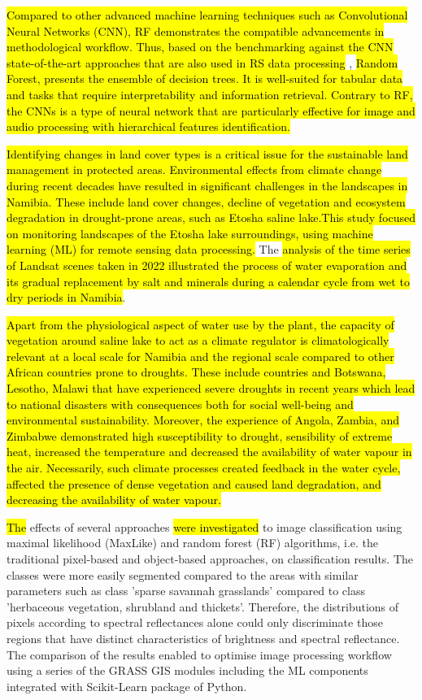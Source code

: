 \documentclass[climate,article,submit,pdftex,moreauthors]{Definitions/mdpi}
\begin{document}
\hl{Compared to other advanced machine learning techniques such as Convolutional Neural Networks (CNN), RF demonstrates the  compatible advancements in methodological workflow. Thus, based on the benchmarking against the CNN state-of-the-art approaches that are also used in RS data processing} \cite{Wang17012022,Ma31122023,Zhaoetal2022}, \hl{Random Forest, presents the ensemble of decision trees. It is well-suited for tabular data and tasks that require interpretability and information retrieval. Contrary to RF, the CNNs is a type of neural network that are particularly effective for image and audio processing with hierarchical features identification.}

\hl{Identifying changes in land cover types is a critical issue for the sustainable land management in protected areas. Environmental effects from climate change during recent decades have resulted in significant challenges in the landscapes in Namibia. These include land cover changes, decline of vegetation and ecosystem degradation in drought-prone areas, such as Etosha saline lake.This study focused on monitoring landscapes of the Etosha lake surroundings, using machine learning (ML) for remote sensing data processing. }The\hl{ analysis of the time series of Landsat scenes taken in 2022 illustrated the process of water evaporation and its gradual replacement by salt and minerals during a calendar cycle from wet to dry periods in Namibia}. 

\hl{Apart from the physiological aspect of water use by the plant, the capacity of vegetation around saline lake to act as a climate regulator is climatologically relevant at a local scale for Namibia and the regional scale compared to other African countries prone to droughts. These include countries and Botswana, Lesotho, Malawi that have experienced severe droughts in recent years which lead to national disasters with consequences both for social well-being and environmental sustainability. Moreover, the experience of Angola, Zambia, and Zimbabwe demonstrated  high susceptibility to drought, sensibility of extreme heat, increased the temperature and decreased the availability of water vapour in the air. Necessarily, such climate processes created feedback in the water cycle, affected the presence of dense vegetation and caused land degradation, and decreasing the availability of water vapour. }

\hl{The} effects of several approaches \hl{were investigated }to image classification using maximal likelihood (MaxLike) and random forest (RF) algorithms, i.e. the traditional pixel-based and object-based approaches, on classification results. The classes were more easily segmented compared to the areas with similar parameters such as class 'sparse savannah grasslands' compared to class 'herbaceous vegetation, shrubland and thickets'. Therefore, the distributions of pixels according to spectral reflectances alone could only discriminate those regions that have distinct characteristics of brightness and spectral reflectance. The comparison of the results enabled to optimise image processing workflow using a series of the GRASS GIS modules including the ML components integrated with Scikit-Learn package of Python.
\end{document}
